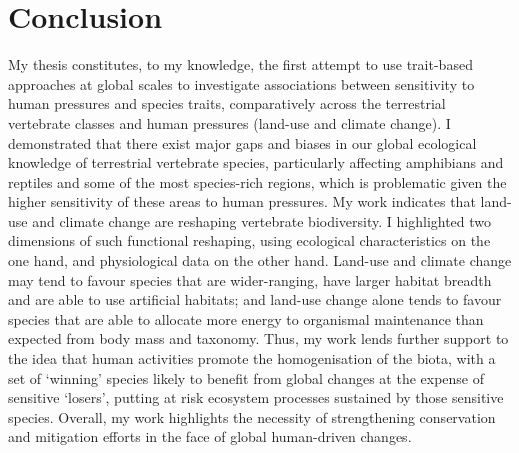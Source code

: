 \section{Conclusion}
My thesis constitutes, to my knowledge, the first attempt to use trait-based approaches at global scales to investigate associations between sensitivity to human pressures and species traits, comparatively across the terrestrial vertebrate classes and human pressures (land-use and climate change). I demonstrated that there exist major gaps and biases in our global ecological knowledge of terrestrial vertebrate species, particularly affecting amphibians and reptiles and some of the most species-rich regions, which is problematic given the higher sensitivity of these areas to human pressures. My work indicates that land-use and climate change are reshaping vertebrate biodiversity. I highlighted two dimensions of such functional reshaping, using ecological characteristics on the one hand, and physiological data on the other hand. Land-use and climate change may tend to favour species that are wider-ranging, have larger habitat breadth and are able to use artificial habitats; and land-use change alone tends to favour species that are able to allocate more energy to organismal maintenance than expected from body mass and taxonomy. Thus, my work lends further support to the idea that human activities promote the homogenisation of the biota, with a set of `winning' species likely to benefit from global changes at the expense of sensitive `losers', putting at risk ecosystem processes sustained by those sensitive species. Overall, my work highlights the necessity of strengthening conservation and mitigation efforts in the face of global human-driven changes. 












